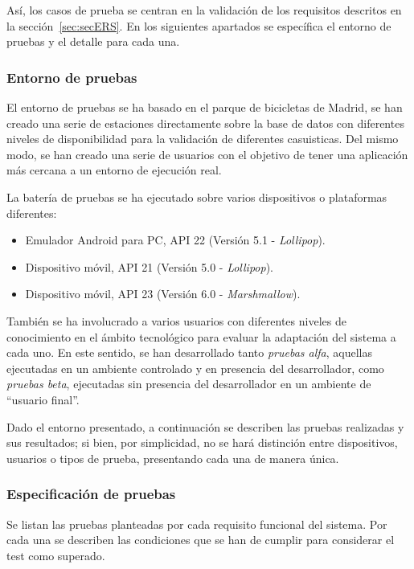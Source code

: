 Así, los casos de prueba se centran en la validación de los requisitos descritos en la sección~\ref{sec:secERS}. En los siguientes apartados se específica el entorno de pruebas y el detalle para cada una.

\subsubsection{Entorno de pruebas}

El entorno de pruebas se ha basado en el parque de bicicletas de Madrid, se han creado una serie de estaciones directamente sobre la base de datos con diferentes niveles de disponibilidad para la validación de diferentes casuisticas. Del mismo modo, se han creado una serie de usuarios con el objetivo de tener una aplicación más cercana a un entorno de ejecución real.

La batería de pruebas se ha ejecutado sobre varios dispositivos o plataformas diferentes:

\begin{itemize}
	\item Emulador Android para PC, API 22 (Versión 5.1 - \textit{Lollipop}).
	\item Dispositivo móvil, API 21 (Versión 5.0 - \textit{Lollipop}).
	\item Dispositivo móvil, API 23 (Versión 6.0 - \textit{Marshmallow}).
\end{itemize}

También se ha involucrado a varios usuarios con diferentes niveles de conocimiento en el ámbito tecnológico para evaluar la adaptación del sistema a cada uno. En este sentido, se han desarrollado tanto \emph{pruebas alfa}, aquellas ejecutadas en un ambiente controlado y en presencia del desarrollador, como \emph{pruebas beta}, ejecutadas sin presencia del desarrollador en un ambiente de ``usuario final''.

Dado el entorno presentado, a continuación se describen las pruebas realizadas y sus resultados; si bien, por simplicidad, no se hará distinción entre dispositivos, usuarios o tipos de prueba, presentando cada una de manera única.

\subsubsection{Especificación de pruebas}

Se listan las pruebas planteadas por cada requisito funcional del sistema. Por cada una se describen las condiciones que se han de cumplir para considerar el test como superado.

